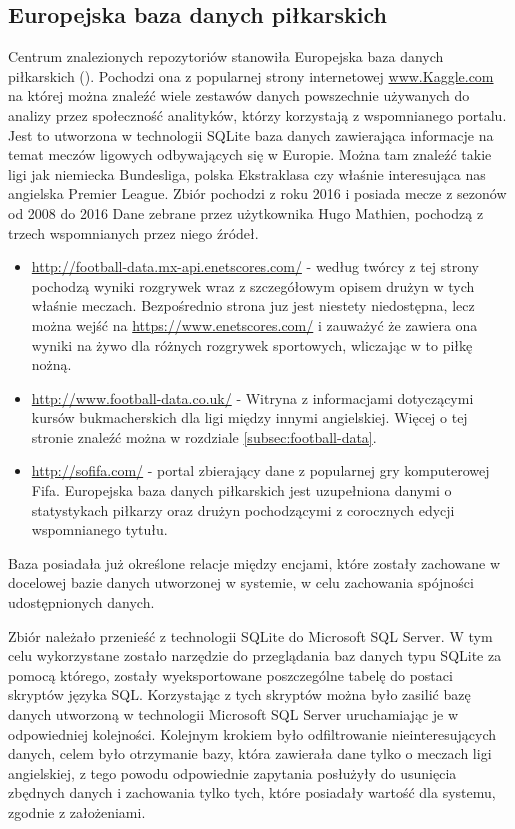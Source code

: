         \subsection{Europejska baza danych piłkarskich}
        \noindent Centrum znalezionych repozytoriów stanowiła Europejska baza danych piłkarskich (). Pochodzi ona z popularnej strony internetowej \url{www.Kaggle.com} na której można znaleźć wiele zestawów danych powszechnie używanych do analizy przez społeczność analityków, którzy korzystają z wspomnianego portalu. Jest to utworzona w technologii SQLite baza danych zawierająca informacje na temat meczów ligowych odbywających się w Europie. Można tam znaleźć takie ligi jak niemiecka Bundesliga, polska Ekstraklasa czy właśnie interesująca nas angielska Premier League. Zbiór pochodzi z roku 2016 i posiada mecze z sezonów od 2008 do 2016 
        Dane zebrane przez użytkownika Hugo Mathien, pochodzą z trzech wspomnianych przez niego źródeł.
        \begin{itemize}
            \item \url{http://football-data.mx-api.enetscores.com/} - według twórcy z tej strony pochodzą wyniki rozgrywek wraz z szczegółowym opisem drużyn w tych właśnie meczach. Bezpośrednio strona juz jest niestety niedostępna, lecz można wejść na \url{https://www.enetscores.com/} i zauważyć że zawiera ona wyniki na żywo dla różnych rozgrywek sportowych, wliczając w to piłkę nożną.
            \item \url{http://www.football-data.co.uk/} - Witryna z informacjami dotyczącymi kursów bukmacherskich dla ligi między innymi angielskiej. Więcej o tej stronie znaleźć można w rozdziale \ref{subsec:football-data}.
            \item \url{http://sofifa.com/} - portal zbierający dane z popularnej gry komputerowej Fifa. Europejska baza danych piłkarskich jest uzupełniona danymi o statystykach piłkarzy oraz drużyn pochodzącymi z corocznych edycji wspomnianego tytułu.
        \end{itemize}
        Baza posiadała już określone relacje między encjami, które zostały zachowane w docelowej bazie danych utworzonej w systemie, w celu zachowania spójności udostępnionych danych. 
        
        Zbiór należało przenieść z technologii SQLite do Microsoft SQL Server. W tym celu wykorzystane zostało narzędzie do przeglądania baz danych typu SQLite za pomocą którego, zostały wyeksportowane poszczególne tabelę do postaci skryptów języka SQL. Korzystając z tych skryptów można było zasilić bazę danych utworzoną w technologii Microsoft SQL Server uruchamiając je w odpowiedniej kolejności. Kolejnym krokiem było odfiltrowanie nieinteresujących danych, celem było otrzymanie bazy, która zawierała dane tylko o meczach ligi angielskiej, z tego powodu odpowiednie zapytania posłużyły do usunięcia zbędnych danych i zachowania tylko tych, które posiadały wartość dla systemu, zgodnie z założeniami.
        
